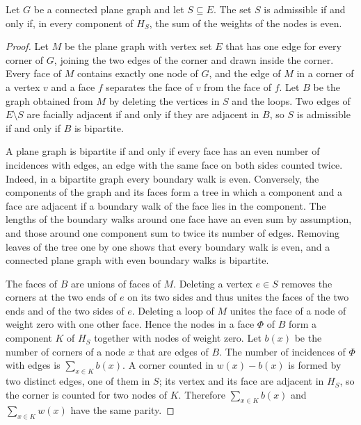 \documentclass[11pt,a4paper]{article}
\begin{document}
\begin{theorem}
\label{thm:parity}
Let $G$ be a connected plane graph and let $S\subseteq E$.
The set $S$ is admissible if and only if, in every component of $H_S$, the sum of the weights of the nodes is even.
\end{theorem}

\begin{proof}
Let $M$ be the plane graph with vertex set $E$ that has one edge for every corner of $G$, joining the two edges of the corner and drawn inside the corner.
Every face of $M$ contains exactly one node of $G$, and the edge of $M$ in a corner of a vertex $v$ and a face $f$ separates the face of $v$ from the face of $f$.
Let $B$ be the graph obtained from $M$ by deleting the vertices in $S$ and the loops.
Two edges of $E\setminus S$ are facially adjacent if and only if they are adjacent in $B$, so $S$ is admissible if and only if $B$ is bipartite.

A plane graph is bipartite if and only if every face has an even number of incidences with edges, an edge with the same face on both sides counted twice.
Indeed, in a bipartite graph every boundary walk is even.
Conversely, the components of the graph and its faces form a tree in which a component and a face are adjacent if a boundary walk of the face lies in the component.
The lengths of the boundary walks around one face have an even sum by assumption, and those around one component sum to twice its number of edges.
Removing leaves of the tree one by one shows that every boundary walk is even, and a connected plane graph with even boundary walks is bipartite.

The faces of $B$ are unions of faces of $M$.
Deleting a vertex $e\in S$ removes the corners at the two ends of $e$ on its two sides and thus unites the faces of the two ends and of the two sides of $e$.
Deleting a loop of $M$ unites the face of a node of weight zero with one other face.
Hence the nodes in a face $\Phi$ of $B$ form a component $K$ of $H_S$ together with nodes of weight zero.
Let $b(x)$ be the number of corners of a node $x$ that are edges of $B$.
The number of incidences of $\Phi$ with edges is $\sum_{x\in K} b(x)$.
A corner counted in $w(x)-b(x)$ is formed by two distinct edges, one of them in $S$; its vertex and its face are adjacent in $H_S$, so the corner is counted for two nodes of $K$.
Therefore $\sum_{x\in K} b(x)$ and $\sum_{x\in K} w(x)$ have the same parity.
\end{proof}
\end{document}
